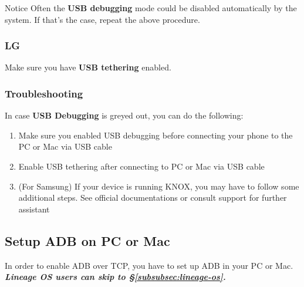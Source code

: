 \begin{tip}{Notice}
    Often the \textbf{USB debugging} mode could be disabled automatically by the system. If that's the case, repeat the
    above procedure.
\end{tip}

\subsubsection{LG} %
Make sure you have \textbf{USB tethering} enabled.

\subsubsection{Troubleshooting} %
In case \textbf{USB Debugging} is greyed out, you can do the following:
\begin{enumerate}
    \item Make sure you enabled USB debugging before connecting your phone to the PC or Mac via USB cable
    \item Enable USB tethering after connecting to PC or Mac via USB cable
    \item (For Samsung) If your device is running KNOX, you may have to follow some additional steps. See official
    documentations or consult support for further assistant
\end{enumerate}

\subsection{Setup ADB on PC or Mac}\label{subsec:setup-adb-on-pc-or-mac} %
In order to enable ADB over TCP, you have to set up ADB in your PC or Mac. \textbf{\textit{Lineage OS users can skip to
§\cref{subsubsec:lineage-os}.}}

